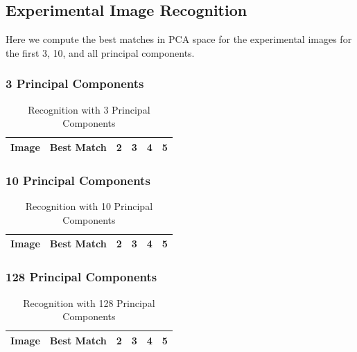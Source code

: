\documentclass[12pt,letterpaper]{article}
\begin{document}
\subsection{Experimental Image Recognition}
Here we compute the best matches in PCA space for the experimental images for
the first 3, 10, and all principal components.
\subsubsection{3 Principal Components}
\begin{table}[h]
  \begin{center}
\begin{tabular}{|l|l|l|l|l|l|}
\hline
\textbf{Image}     & \textbf{Best Match} & \textbf{2}    & \textbf{3}    & \textbf{4}    & \textbf{5}    \\ \hline

\end{tabular}
  \caption{Recognition with 3 Principal Components}
  \end{center}
\end{table}


\clearpage

\subsubsection{10 Principal Components}
\begin{table}[h]
\begin{center}
\begin{tabular}{|l|l|l|l|l|l|}
\hline
\textbf{Image}     & \textbf{Best Match} & \textbf{2}    & \textbf{3}             & \textbf{4}    & \textbf{5}    \\ \hline

\end{tabular}
  \caption{Recognition with 10 Principal Components}
  \end{center}
\end{table}


\clearpage

\subsubsection{128 Principal Components}
\begin{table}[h]
\begin{tabular}{|l|l|l|l|l|l|}
\hline
\textbf{Image}     & \textbf{Best Match} & \textbf{2}             & \textbf{3}    & \textbf{4}    & \textbf{5}    \\ \hline

\end{tabular}
  \caption{Recognition with 128 Principal Components}
\end{table}
\end{document}
